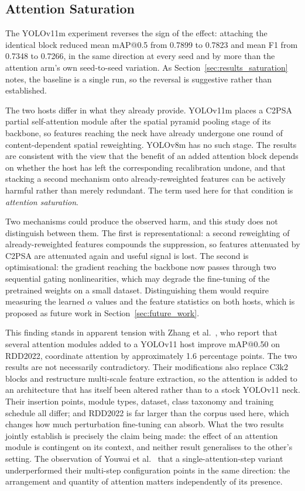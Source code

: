 \documentclass[MScCS]{uccthesis}
\begin{document}
\subsection{Attention Saturation}
\label{sec:disc_saturation}

The YOLOv11m experiment reverses the sign of the effect: attaching the
identical block reduced mean mAP@0.5 from 0.7899 to 0.7823 and mean F1 from
0.7348 to 0.7266, in the same direction at every seed and by more than the
attention arm's own seed-to-seed variation. As
Section~\ref{sec:results_saturation} notes, the baseline is a single run, so
the reversal is suggestive rather than established.

The two hosts differ in what they already provide. YOLOv11m places a C2PSA
partial self-attention module after the spatial pyramid pooling stage of its
backbone, so features reaching the neck have already undergone one round of
content-dependent spatial reweighting. YOLOv8m has no such stage. The results
are consistent with the view that the benefit of an added attention block
depends on whether the host has left the corresponding recalibration undone,
and that stacking a second mechanism onto already-reweighted features can be
actively harmful rather than merely redundant. The term used here for that
condition is \emph{attention saturation}.

Two mechanisms could produce the observed harm, and this study does not
distinguish between them. The first is representational: a second reweighting
of already-reweighted features compounds the suppression, so features
attenuated by C2PSA are attenuated again and useful signal is lost. The second
is optimisational: the gradient reaching the backbone now passes through two
sequential gating nonlinearities, which may degrade the fine-tuning of the
pretrained weights on a small dataset. Distinguishing them would require
measuring the learned $\alpha$ values and the feature statistics on both hosts,
which is proposed as future work in Section~\ref{sec:future_work}.

This finding stands in apparent tension with Zhang et
al.~\parencite{zhang2025automatic}, who report that several attention modules
added to a YOLOv11 host improve mAP@0.50 on RDD2022, coordinate attention by
approximately 1.6 percentage points. The two results are not necessarily
contradictory. Their modifications also replace C3k2 blocks and restructure
multi-scale feature extraction, so the attention is added to an architecture
that has itself been altered rather than to a stock YOLOv11 neck. Their
insertion points, module types, dataset, class taxonomy and training schedule
all differ; and RDD2022 is far larger than the corpus used here, which changes
how much perturbation fine-tuning can absorb. What the two results jointly
establish is precisely the claim being made: the effect of an attention module
is contingent on its context, and neither result generalises to the other's
setting. The observation of Youwai et al.~\parencite{youwai2024yolo9tr} that a
single-attention-step variant underperformed their multi-step configuration
points in the same direction: the arrangement and quantity of attention
matters independently of its presence.
\end{document}
